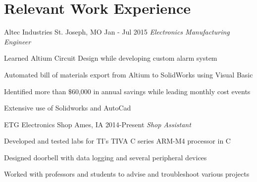 \documentclass[]{friggeri-cv} %
\begin{document}
\section{Relevant Work Experience}
\begin{entrylist}
\entry
{Altec Industries}
{St. Joseph, MO}
{Jan - Jul 2015}
{\emph{Electronics Manufacturing Engineer}}
{\begin{itemizenosep}
	\item Learned Altium Circuit Design while developing custom alarm system 
	\item Automated bill of materials export from Altium to SolidWorks using Visual Basic
	\item Identified more than $\$$60,000 in annual savings while leading monthly cost events
	\item Extensive use of Solidworks and AutoCad
\end{itemizenosep}}
\entry
{ETG Electronics Shop}
{Ames, IA}
{2014-Present}
{\emph{Shop Assistant}}
{\begin{itemizenosep}
	\item Developed and tested labs for TI's TIVA C series ARM-M4 processor in C
	\item Designed doorbell with data logging and several peripheral devices 
	\item Worked with professors and students to advise and troubleshoot various projects
\end{itemizenosep}}
\end{entrylist}


\end{document}
